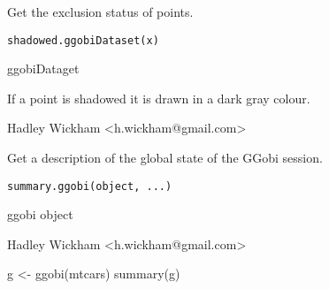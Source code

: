 \documentclass{article}
\begin{document}
\begin{Description}\relax
Get the exclusion status of points.
\end{Description}
\begin{Usage}
\begin{verbatim}shadowed.ggobiDataset(x)\end{verbatim}
\end{Usage}
\begin{Arguments}
\begin{ldescription}
\item[\code{x}] ggobiDataget
\end{ldescription}
\end{Arguments}
\begin{Details}\relax
If a point is shadowed it is drawn in a dark gray colour.
\end{Details}
\begin{Author}\relax
Hadley Wickham <h.wickham@gmail.com>
\end{Author}
\begin{SeeAlso}\relax
{}
\end{SeeAlso}
\begin{Examples}
\begin{ExampleCode}\end{ExampleCode}
\end{Examples}

\begin{Description}\relax
Get a description of the global state of the GGobi session.
\end{Description}
\begin{Usage}
\begin{verbatim}summary.ggobi(object, ...)\end{verbatim}
\end{Usage}
\begin{Arguments}
\begin{ldescription}
\item[\code{object}] ggobi object
\item[\code{...}] 
\end{ldescription}
\end{Arguments}
\begin{Details}\relax
\end{Details}
\begin{Author}\relax
Hadley Wickham <h.wickham@gmail.com>
\end{Author}
\begin{Examples}
\begin{ExampleCode}g <- ggobi(mtcars)
summary(g)\end{ExampleCode}
\end{Examples}
\end{document}
